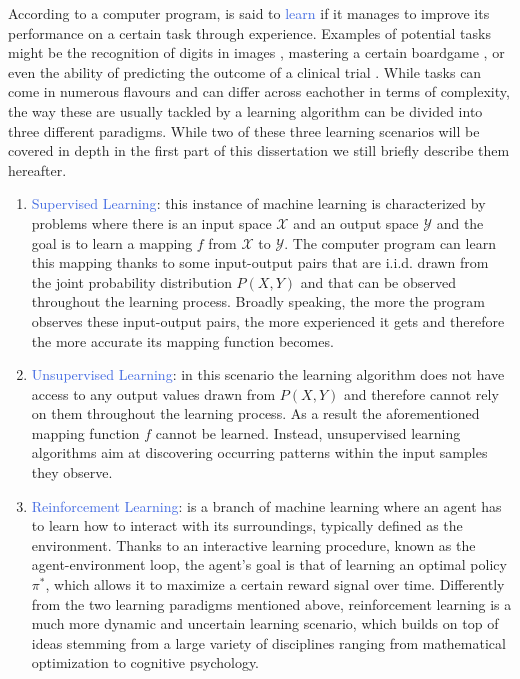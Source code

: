 According to \citet{mitchell1997machine} a computer program, is said to \textcolor{RoyalBlue}{learn} if it manages to improve its performance on a certain task through experience.
Examples of potential tasks might be the recognition of digits in images \cite{lecun1994mnist}, mastering a certain boardgame \cite{silver2017mastering}, or even the ability of predicting the outcome of a clinical trial \cite{zhao2011reinforcement}. While tasks can come in numerous flavours and can differ across eachother in terms of complexity, the way these are usually tackled by a learning algorithm can be divided into three different paradigms. While two of these three learning scenarios will be covered in depth in the first part of this dissertation we still briefly describe them hereafter.

\begin{enumerate}
	\item \textcolor{RoyalBlue}{Supervised Learning}: this instance of machine learning is characterized by problems where there is an input space $\mathcal{X}$ and an output space $\mathcal{Y}$ and the goal is to learn a mapping $f$ from $\mathcal{X}$ to $\mathcal{Y}$. The computer program can learn this mapping thanks to some input-output pairs that are i.i.d. drawn from the joint probability distribution $P(X,Y)$ and that can be observed throughout the learning process. Broadly speaking, the more the program observes these input-output pairs, the more experienced it gets and therefore the more accurate its mapping function becomes.  
	\item \textcolor{RoyalBlue}{Unsupervised Learning}: in this scenario the learning algorithm does not have access to any output values drawn from $P(X,Y)$ and therefore cannot rely on them throughout the learning process. As a result the aforementioned mapping function $f$ cannot be learned. Instead, unsupervised learning algorithms aim at discovering occurring patterns within the input samples they observe.  
	\item \textcolor{RoyalBlue}{Reinforcement Learning}: is a branch of machine learning where an agent has to learn how to interact with its surroundings, typically defined as the environment. Thanks to an interactive learning procedure, known as the agent-environment loop, the agent's goal is that of learning an optimal policy $\pi^{*}$, which allows it to maximize a certain reward signal over time. Differently from the two learning paradigms mentioned above, reinforcement learning is a much more dynamic and uncertain learning scenario, which builds on top of ideas stemming from a large variety of disciplines ranging from mathematical optimization to cognitive psychology.   
\end{enumerate}


